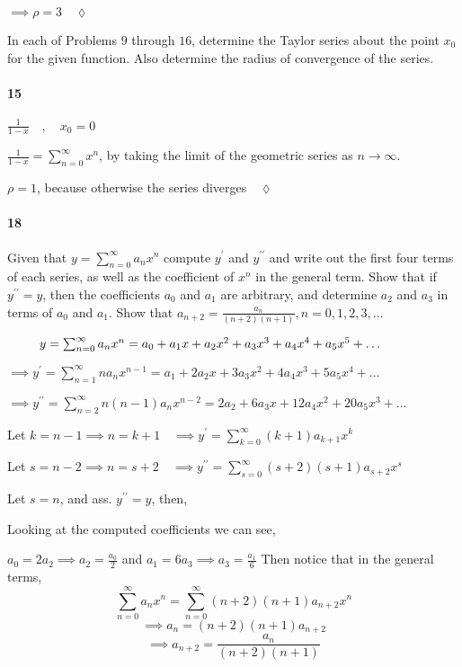 \documentclass{article}
\begin{document}
$\implies \rho = 3 \quad \lozenge$

In each of Problems $9$ through $16$, determine the Taylor series
about the point $x_0$ for the given function. Also determine the
radius of convergence of the series.

\paragraph{15} $\frac{1}{1-x}\quad,\quad x_0 = 0$


$\frac{1}{1-x} = \sum_{n=0}^{\infty} x^n$, by taking the
limit of the geometric series as $n\rightarrow \infty$.

$\rho = 1$, because otherwise the series diverges$\quad \lozenge$

\paragraph{18} Given that $y = \sum_{n=0}^{\infty} a_nx^n$ compute
$y^\prime$ and $y^{\prime\prime}$ and write out the first four terms of each
series, as well as the coefficient of $x^n$ in the general term. Show that if $y^{\prime\prime} = y$, then the
coefficients $a_0$ and $a_1$ are arbitrary, and determine $a_2$ and $a_3$ in terms of $a_0$ and $a_1$. Show
that $a_{n+2} = \frac{a_n}{(n + 2)(n + 1)}, n = 0, 1, 2, 3, \dots$


$\quad\quad\enskip y = \sum_{n=0}^{\infty} a_nx^n  = a_0+a_1x+a_2x^2+a_3x^3+ a_4x^4+a_5x^5+\dots$

$\implies y^{\prime} = \sum_{n=1}^{\infty} na_nx^{n-1} = a_1 +2a_2x +3a_3x^2+4a_4x^3+5a_5x^4+\dots$

$\implies y^{\prime\prime} = \sum_{n=2}^{\infty} n(n-1)a_nx^{n-2} = 2a_2+6a_3x+12a_4x^2+20a_5x^3+\dots$

Let $k = n-1 \implies n = k+1\quad \implies y^{\prime} =
\sum_{k=0}^{\infty} (k+1)a_{k+1}x^{k}$

Let $s = n-2 \implies n = s+2\quad \implies y^{\prime\prime} = \sum_{s=0}^{\infty} (s+2)(s+1)a_{s+2}x^{s}$

Let $s = n$, and ass. $y^{\prime\prime} = y$, then,

Looking at the computed coefficients we can see,

$a_0 = 2a_2 \implies a_2 = \frac{a_0}{2}$
and
$a_1 = 6a_3 \implies a_3 = \frac{a_1}{6}$
Then notice that in the general terms,
\[\sum_{n=0}^{\infty} a_nx^n = \sum_{n=0}^{\infty}
  (n+2)(n+1)a_{n+2}x^{n}\]
\[\implies a_n = (n+2)(n+1)a_{n+2}\]
\[\implies a_{n+2} = \frac{a_n}{(n+2)(n+1)}\]
\end{document}
